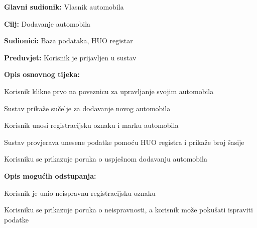 					\noindent {}
					\begin{packed_item}
						
						\item \textbf{Glavni sudionik: } Vlasnik automobila
						\item  \textbf{Cilj:} Dodavanje automobila
						\item  \textbf{Sudionici:} Baza podataka, HUO registar
						\item  \textbf{Preduvjet:} Korisnik je prijavljen u sustav
						\item  \textbf{Opis osnovnog tijeka:}
						
						\item[] \begin{packed_enum}
							
							\item Korisnik klikne prvo na poveznicu za upravljanje svojim automobila
							\item Sustav prikaže sučelje za dodavanje novog automobila
							\item Korisnik unosi registracijsku oznaku i marku automobila
							\item Sustav provjerava unesene podatke pomoću HUO registra i prikaže broj šasije
							\item Korisniku se prikazuje poruka o uspješnom dodavanju automobila
							
						\end{packed_enum}
					
						\item  \textbf{Opis mogućih odstupanja:}
						
						\item[] \begin{packed_item}
							
							\item[4.a] Korisnik je unio neispravnu registracijsku oznaku
							\item[] \begin{packed_enum}
								
								\item Korisniku se prikazuje poruka o neispravnosti, a korisnik može pokušati ispraviti podatke
								
							\end{packed_enum}
							
						\end{packed_item}
						\end{packed_item}
					
